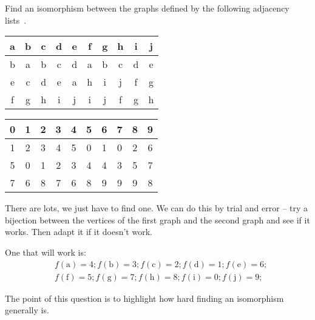 \begin{questions}
\question
  Find an isomorphism between the graphs defined by the following adjacency lists~\cite{biggs02}.
  \begin{center}
    \begin{tabular}{cccccccccc}
      a & b & c & d & e & f & g & h & i & j \\
      \hline
      b & a & b & c & d & a & b & c & d & e \\
      e & c & d & e & a & h & i & j & f & g \\
      f & g & h & i & j & i & j & f & g & h 
    \end{tabular}
    \hspace{1cm}
    \begin{tabular}{cccccccccc}
      0 & 1 & 2 & 3 & 4 & 5 & 6 & 7 & 8 & 9 \\
      \hline
      1 & 2 & 3 & 4 & 5 & 0 & 1 & 0 & 2 & 6 \\
      5 & 0 & 1 & 2 & 3 & 4 & 4 & 3 & 5 & 7 \\
      7 & 6 & 8 & 7 & 6 & 8 & 9 & 9 & 9 & 8 
    \end{tabular}
  \end{center}

\begin{solution}
  There are lots, we just have to find one.
  We can do this by trial and error -- try a bijection between the vertices of the first graph and the second graph and see if it works.
  Then adapt it if it doesn't work.
  
  One that will work is:
  \begin{align*}
  &f(\textrm{a}) = 4; f(\textrm{b}) = 3; f(\textrm{c}) = 2; f(\textrm{d}) = 1; f(\textrm{e}) = 6; \\
  &f(\textrm{f}) = 5; f(\textrm{g}) = 7; f(\textrm{h}) = 8; f(\textrm{i}) = 0; f(\textrm{j}) = 9;
  \end{align*}
  
  The point of this question is to highlight how hard finding an isomorphism generally is.
\end{solution}



\end{questions}
